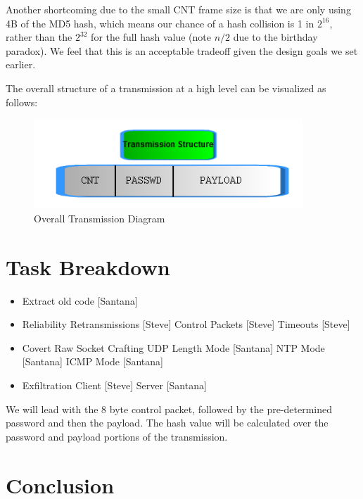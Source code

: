 \documentclass[titlepage]{article}
\begin{document}
Another shortcoming due to the small CNT frame size is that we are only using 4B of the MD5 hash, which means our chance of a hash collision is 1 in $2^{16}$, rather than the $2^{32}$
for the full hash value (note $n/2$ due to the birthday paradox). We feel that this is an acceptable tradeoff given the design goals we set earlier.

The overall structure of a transmission at a high level can be visualized as follows:

\clearpage

\begin{figure}[htb]                                                                       
  \begin{center}
    \includegraphics[width=0.9\textwidth]{imgs/transmission.png}
  \end{center}
  \caption{Overall Transmission Diagram}
  \label{fig:transmission}
\end{figure}

\clearpage

\section{Task Breakdown}

\begin{itemize}
	\item Extract old code [Santana]
	\item Reliability
	\subitem Retransmissions [Steve]
	\subitem Control Packets [Steve]
	\subitem Timeouts [Steve]
	\item Covert Raw Socket Crafting
	\subitem UDP Length Mode [Santana]
	\subitem NTP Mode [Santana]
	\subitem ICMP Mode [Santana]
	\item Exfiltration
	\subitem Client [Steve]
	\subitem Server [Santana]
\end{itemize}

We will lead with the 8 byte control packet, followed by the pre-determined password and then the payload. The hash value will be calculated over the password and payload
portions of the transmission.

\section{Conclusion}
\end{document}
